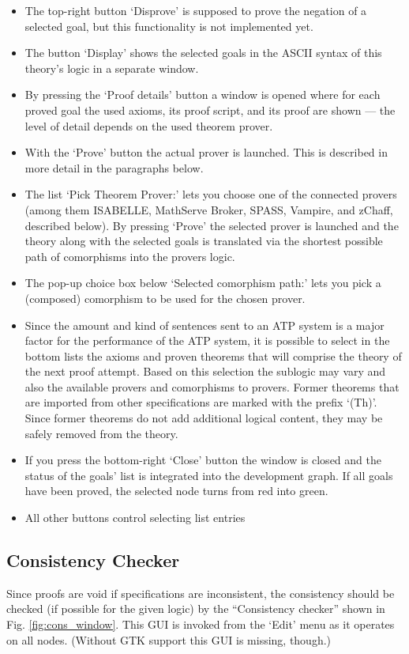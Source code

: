 \documentclass{article}
\newcommand{\normalTEXTSC}[2]{{#1\scriptsize#2}}
\newcommand     {\Isabelle}{\normalTEXTSC{I}{SABELLE}\xspace}
\newcommand     {\SPASS}{\normalTEXTSC{S}{PASS}\xspace}
\begin{document}
\begin{itemize}
\item The top-right button `Disprove' is supposed to prove the negation of a
  selected goal, but this functionality is not implemented yet.
\item The button `Display' shows the selected goals in the ASCII syntax of
  this theory's logic in a separate window.
\item By pressing the `Proof details' button a window is opened where for each
  proved goal the used axioms, its proof script, and its proof are shown ---
  the level of detail depends on the used theorem prover.
\item With the `Prove' button the actual prover is launched. This is described
  in more detail in the paragraphs below.
\item The list `Pick Theorem Prover:' lets you choose one of the connected
  provers (among them \Isabelle, MathServe Broker, \SPASS, Vampire, and
  zChaff, described below). By pressing `Prove' the selected prover is
  launched and the theory along with the selected goals is translated via the
  shortest possible path of comorphisms into the provers logic.
\item The pop-up choice box below `Selected comorphism path:' lets you pick a
  (composed) comorphism to be used for the chosen prover.
\item Since the amount and kind of sentences sent to an ATP system is a major
  factor for the performance of the ATP system, it is possible to select in
  the bottom lists the axioms and proven theorems that will comprise the
  theory of the next proof attempt. Based on this selection the sublogic may
  vary and also the available provers and comorphisms to provers. Former
  theorems that are imported from other specifications are marked with the
  prefix `(Th)'. Since former theorems do not add additional logical content,
  they may be safely removed from the theory.
\item If you press the bottom-right `Close' button the window is closed and
  the status of the goals' list is integrated into the development graph. If
  all goals have been proved, the selected node turns from red into green.
\item All other buttons control selecting list entries
\end{itemize}

\subsection{Consistency Checker}
\label{sec:CC}
Since proofs are void if specifications are inconsistent, the consistency
should be checked (if possible for the given logic) by the ``Consistency
checker'' shown in Fig. \ref{fig:cons_window}.  This GUI is invoked from
the `Edit' menu as it operates on all nodes.  (Without GTK support this GUI is
missing, though.)
\end{document}
